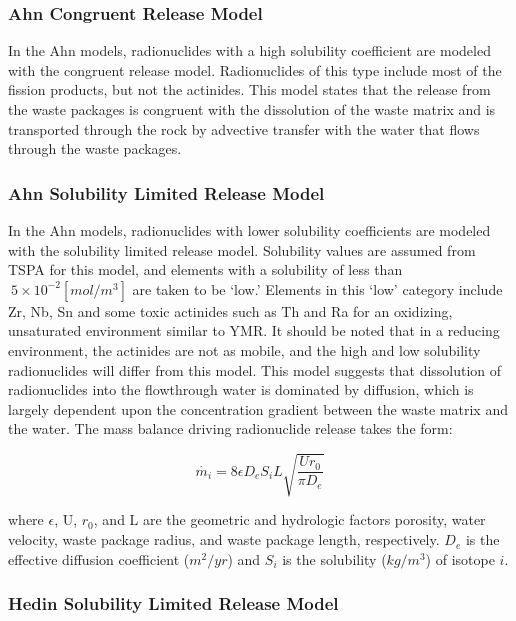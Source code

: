 \subsubsection{Ahn Congruent Release Model} 

In the Ahn models, radionuclides with a high solubility coefficient are modeled with
the congruent release model.  Radionuclides of this type include most of the fission
products, but not the actinides. This model states that the release from the
waste packages is congruent with the dissolution of the waste matrix and is
transported through the rock by advective transfer with the water that flows
through the waste packages.  

\subsubsection{Ahn Solubility Limited Release Model}

In the Ahn models, radionuclides with lower solubility coefficients are modeled with
the solubility limited release model.  Solubility values are assumed from TSPA
for this model, and elements with a solubility of less than $~5\times 10^{-2}
[mol/m^3]$ are taken to be
`low.' Elements in this `low' category include Zr, Nb, Sn and some toxic actinides 
such as Th and Ra for an oxidizing, unsaturated environment similar to \gls{YMR}.
It should be noted that in a reducing environment, the actinides are not as mobile, 
and the high and low solubility radionuclides will differ from this model.
This model suggests that dissolution of radionuclides into the flowthrough water 
is dominated by diffusion, which is largely dependent upon the concentration 
gradient between the waste matrix and the water. The mass balance driving 
radionuclide release takes the form:

\begin{equation}
 \dot{m_i}=8\epsilon D_eS_iL\sqrt{\frac{Ur_0}{\pi D_e}}
\end{equation} 

where $\epsilon$, U, $r_0$, and L are the geometric and
hydrologic factors porosity, water velocity, waste package radius, and waste
package length, respectively. $D_e$ is the effective diffusion coefficient
($m^2/yr$)  and $S_i$ is the solubility ($kg/m^3$) of isotope $i$.


\subsubsection{Hedin Solubility Limited Release Model}

